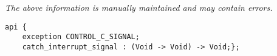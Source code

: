 \label{api:Trap\_Control\_C}

{\tiny \it The above information is manually maintained and may contain errors.}
\begin{verbatim}
api {
    exception CONTROL_C_SIGNAL;
    catch_interrupt_signal : (Void -> Void) -> Void;};
\end{verbatim}
